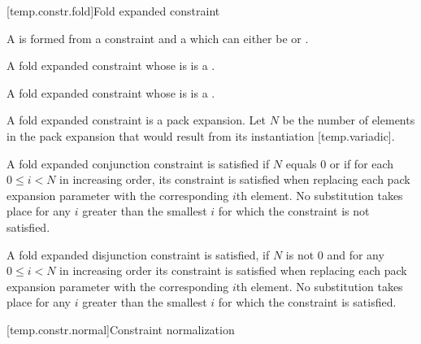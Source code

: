 \documentclass{wg21}
\begin{document}
\begin{addedblock}
[temp.constr.fold]{Fold expanded constraint}

A  is formed from a constraint and a  which can either be \tcode{\&\&} or \tcode{||}.

A fold expanded constraint whose  is \tcode{\&\&} is a .

A fold expanded constraint whose  is \tcode{||} is a .

A fold expanded constraint is a pack expansion. Let $N$ be the number of elements in the pack expansion that would result from its instantiation [temp.variadic].

A fold expanded conjunction constraint is satisfied if $N$ equals $0$ or if for each $0 \le i < N$ in increasing order, its constraint is satisfied when replacing each pack expansion parameter with the corresponding $i$th element. No substitution takes place for any $i$ greater than the smallest $i$ for which the constraint is not satisfied.


A fold expanded disjunction constraint is satisfied, if $N$ is not $0$ and for any $0 \le i < N$ in increasing order its constraint is satisfied when replacing each pack expansion parameter with the corresponding $i$th element. No substitution takes place for any $i$ greater than the smallest $i$ for which the constraint is satisfied.


\end{addedblock}




\ednote{[...]}


[temp.constr.normal]{Constraint normalization}
%
\end{document}
